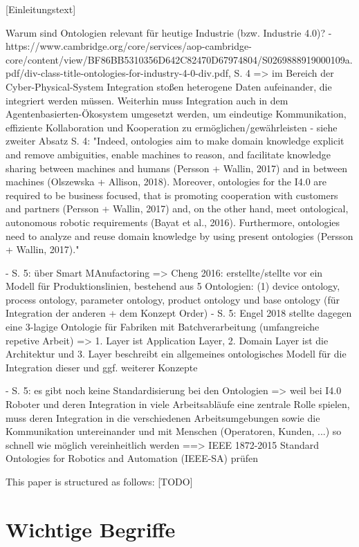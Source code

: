 \documentclass{article}
\begin{document}
[Einleitungstext]

Warum sind Ontologien relevant für heutige Industrie (bzw. Industrie 4.0)?
- https://www.cambridge.org/core/services/aop-cambridge-core/content/view/BF86BB5310356D642C82470D67974804/S0269888919000109a.pdf/div-class-title-ontologies-for-industry-4-0-div.pdf, S. 4 => im Bereich der Cyber-Physical-System Integration stoßen heterogene Daten aufeinander, die integriert werden müssen. Weiterhin muss Integration auch in dem Agentenbasierten-Ökosystem umgesetzt werden, um eindeutige Kommunikation, effiziente Kollaboration und Kooperation zu ermöglichen/gewährleisten
- siehe zweiter Absatz S. 4: "Indeed, ontologies aim
 to make domain knowledge explicit and remove ambiguities, enable machines to reason, and facilitate
 knowledge sharing between machines and humans (Persson + Wallin, 2017) and in between machines
 (Olszewska + Allison, 2018). Moreover, ontologies for the I4.0 are required to be business focused, that
 is promoting cooperation with customers and partners (Persson + Wallin, 2017) and, on the other hand,
 meet ontological, autonomous robotic requirements (Bayat et al., 2016). Furthermore, ontologies need to
 analyze and reuse domain knowledge by using present ontologies (Persson + Wallin, 2017)."

- S. 5: über Smart MAnufactoring => Cheng 2016: erstellte/stellte vor ein Modell für Produktionslinien, bestehend aus 5 Ontologien: (1) device ontology, process ontology, parameter ontology, product ontology und base ontology (für Integration der anderen + dem Konzept Order)
- S. 5: Engel 2018 stellte dagegen eine 3-lagige Ontologie für Fabriken mit Batchverarbeitung (umfangreiche repetive Arbeit) => 1. Layer ist Application Layer, 2. Domain Layer ist die Architektur und 3. Layer beschreibt ein allgemeines ontologisches Modell für die Integration dieser und ggf. weiterer Konzepte

- S. 5: es gibt noch keine Standardisierung bei den Ontologien => weil bei I4.0 Roboter und deren Integration in viele Arbeitsabläufe eine zentrale Rolle spielen, muss deren Integration in die verschiedenen Arbeitsumgebungen sowie die Kommunikation untereinander und mit Menschen (Operatoren, Kunden, ...) so schnell wie möglich vereinheitlich werden ==> IEEE 1872-2015 Standard Ontologies for Robotics and Automation (IEEE-SA) prüfen

This paper is structured as follows: [TODO]


\section{Wichtige Begriffe}
\end{document}

